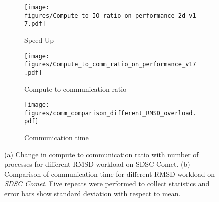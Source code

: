 \begin{figure}[ht!]
\centering
\begin{subfigure} {.33\textwidth}
  \texttt{[image: figures/Compute\_to\_IO\_ratio\_on\_performance\_2d\_v17.pdf]}
  \caption{Speed-Up}
  \label{fig:S1_tcomp_tcomm_effect}
\end{subfigure}
\hfill
\begin{subfigure}{.3\textwidth}
  \texttt{[image: figures/Compute\_to\_comm\_ratio\_on\_performance\_v17.pdf]}
  \captionsetup{format=hang}
\caption{Compute to communication ratio}
\label{fig:tcomp_tcomm_ratio}
\end{subfigure}
\hfill
\begin{subfigure}{.33\textwidth}
  \texttt{[image: figures/comm\_comparison\_different\_RMSD\_overload.pdf]}
  \caption{Communication time}
  \label{fig:Comm_time_tcomp_tcomm_effect}
\end{subfigure}
\caption{(a) Change in compute to communication ratio with number of processes for different RMSD workload on SDSC Comet. 
(b) Comparison of communication time for different RMSD workload on \emph{SDSC Comet}.
Five repeats were performed to collect statistics and error bars show standard deviation with respect to mean.}
\label{fig:tcom_tcomm_effect}
\end{figure}

